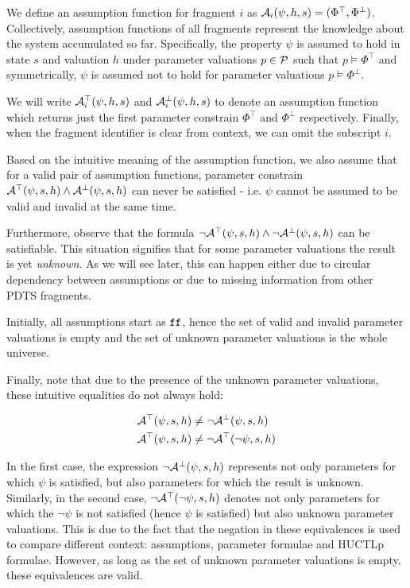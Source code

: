 We define an assumption function for fragment $i$ as $\mathcal{A}_i(\psi, h, s) = (\Phi^\top, \Phi^\bot)$. Collectively, assumption functions of all fragments represent the knowledge about the system accumulated so far. Specifically, the property $\psi$ is assumed to hold in state $s$ and valuation $h$ under parameter valuations $p \in \mathcal{P}$ such that $p \models \Phi^\top$ and symmetrically, $\psi$ is assumed not to hold for parameter valuations $p \models \Phi^\bot$.

We will write $\mathcal{A}^\top_i(\psi, h, s)$ and $\mathcal{A}^\bot_i(\psi, h, s)$ to denote an assumption function which returns just the first parameter constrain $\Phi^\top$ and $\Phi^\bot$ respectively. Finally, when the fragment identifier is clear from context, we can omit the subscript $i$.

Based on the intuitive meaning of the assumption function, we also assume that for a valid pair of assumption functions, parameter constrain $\mathcal{A}^\top(\psi, s, h) \land \mathcal{A}^\bot(\psi, s, h)$ can never be satisfied - i.e. $\psi$ cannot be assumed to be valid and invalid at the same time.

Furthermore, observe that the formula $\neg\mathcal{A}^\top(\psi, s, h) \land \neg\mathcal{A}^\bot(\psi, s, h)$ can be satisfiable. This situation signifies that for some parameter valuations the result is yet \emph{unknown}. As we will see later, this can happen either due to circular dependency between assumptions or due to missing information from other \ac{PDTS} fragments.


Initially, all assumptions start as $\texttt{ff}$, hence the set of valid and invalid parameter valuations is empty and the set of unknown parameter valuations is the whole universe.

Finally, note that due to the presence of the unknown parameter valuations, these intuitive equalities do not always hold:

\begin{align*}
	\mathcal{A}^\top(\psi, s, h) & \not= \neg \mathcal{A}^\bot(\psi, s, h) \\
	\mathcal{A}^\top(\psi, s, h) & \not= \neg \mathcal{A}^\top(\neg \psi, s, h)
\end{align*}

In the first case, the expression $\neg \mathcal{A}^\bot(\psi, s, h)$ represents not only parameters for which $\psi$ is satisfied, but also parameters for which the result is unknown. Similarly, in the second case, $\neg \mathcal{A}^\top(\neg \psi, s, h)$ denotes not only parameters for which the $\neg \psi$ is not satisfied (hence $\psi$ is satisfied) but also unknown parameter valuations. This is due to the fact that the negation in these equivalences is used to compare different context: assumptions, parameter formulae and \ac{HUCTLp} formulae. However, as long as the set of unknown parameter valuations is empty, these equivalences are valid.

